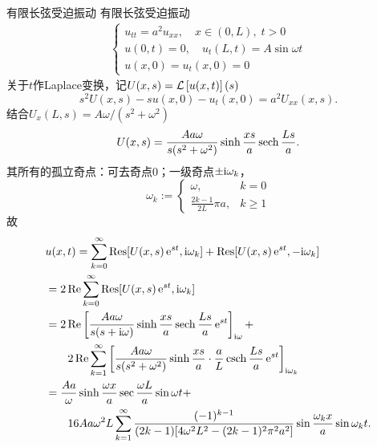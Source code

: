 \begin{example}{有限长弦受迫振动}{}
	有限长弦受迫振动
	\begin{align*}
		\begin{cases}
			u_{tt}=a^2u_{xx},\quad x\in(0,L),\;t>0\\
			u(0,t)=0,\quad u_t(L,t)=A\sin\omega t\\
			u(x,0)=u_t(x,0)=0
		\end{cases}
	\end{align*}
	关于$t$作Laplace变换，记$U(x,s)=\mathcal L\left[u(x,t)\right](s)$
	\[
		s^2U(x,s)-s u(x,0)-u_t(x,0)=a^2U_{xx}(x,s).
	\]
	结合$U_x(L,s)=A\omega/(s^2+\omega^2)$
	\[
		U(x,s)=\frac{Aa\omega}{s(s^2+\omega^2)}\sinh\frac{xs}a\operatorname{sech}\frac{Ls}a.
	\]
	其所有的孤立奇点：可去奇点0；一级奇点$\pm\mathrm{i}\omega_k$，
	\[
		\omega_k:=
		\begin{cases}
			\omega,&k=0\\
			\frac{2k-1}{2L}\pi a,&k\geqslant 1
		\end{cases}
	\]
	故
	\begin{align*}
		&u(x,t)=\sum_{k=0}^\infty\operatorname{Res}[U(x,s)\mathop{}\!\mathrm{e}^{st},\mathrm{i}\omega_k]+\operatorname{Res}[U(x,s)\mathop{}\!\mathrm{e}^{st},-\mathrm{i}\omega_k]\\
		&=2\operatorname{Re}\sum_{k=0}^\infty\operatorname{Res}[U(x,s)\mathop{}\!\mathrm{e}^{st},\mathrm{i}\omega_k]\\
		&=2\operatorname{Re}\left[\frac{Aa\omega}{s(s+\mathrm{i}\omega)}\sinh\frac{xs}a\operatorname{sech}\frac{Ls}a\mathop{}\!\mathrm{e}^{st}\right]_{\mathrm{i}\omega}+\\
		&\qquad 2\operatorname{Re}\sum_{k=1}^\infty\left[\frac{Aa\omega}{s(s^2+\omega^2)}\sinh\frac{xs}a\cdot\frac aL\operatorname{csch}\frac{Ls}a\mathop{}\!\mathrm{e}^{st}\right]_{\mathrm{i}\omega_k}\\
		&=\frac{Aa}\omega\sinh\frac{\omega x}a\sec\frac{\omega L}a\sin\omega t+\\
		&\qquad 16Aa\omega^2L\sum_{k=1}^\infty\frac{(-1)^{k-1}}{(2k-1)[4\omega^2L^2-(2k-1)^2\pi^2a^2]}\sin\frac{\omega_kx}a\sin\omega_kt.
	\end{align*}
\end{example}

